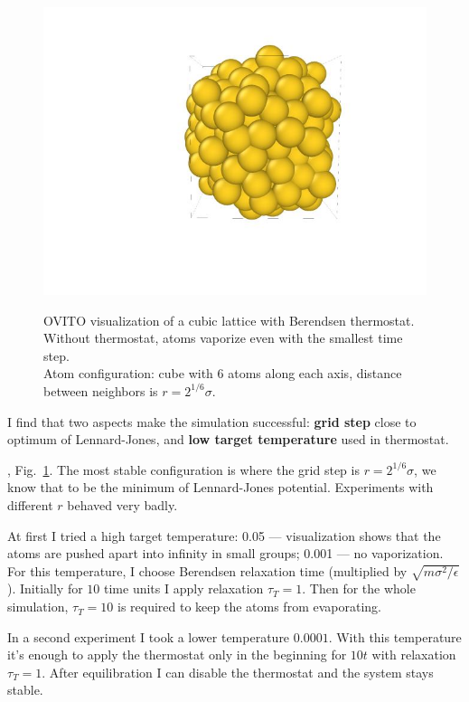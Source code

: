 \documentclass[12pt,a4paper]{article}
\begin{document}
\begin{figure}[htb]
\begin{minipage}{.3\textwidth}
{			\includegraphics[trim={1.8cm 1.8cm 2.2cm 1cm},clip]{img/sim3.jpg}}
	\end{minipage}
	\caption{OVITO visualization of a cubic lattice with Berendsen thermostat. Without thermostat, atoms vaporize even with the smallest time step.\\
	Atom configuration: cube with 6 atoms along each axis, distance between neighbors is $r=2^{1/6}\sigma$.  }
	\label{fig:first_simulation_ovito}
\end{figure}



I find that two aspects make the simulation successful: {\bf grid step} close to optimum of Lennard-Jones, and {\bf low target temperature} used in thermostat.

, Fig.~\ref{fig:first_simulation_ovito}. The most stable configuration is where the grid step is $r = 2^{1/6}\sigma$, we know that to be the minimum of Lennard-Jones potential. Experiments with different $r$ behaved very badly.

At first I tried a high target temperature: 0.05 --- visualization shows that the atoms are pushed apart into infinity in small groups; 0.001 --- no vaporization. For this temperature, I choose Berendsen relaxation time (multiplied by \( \sqrt{m\sigma^2 / \epsilon} \)). Initially for $10$ time units I apply relaxation \( \tau_T = 1 \). Then for the whole simulation, \( \tau_T = 10 \) is required to keep the atoms from evaporating. 

In a second experiment I took a lower temperature $0.0001$. With this temperature it's enough to apply the thermostat only in the beginning for $10t$ with relaxation $\tau_T = 1$. After equilibration I can disable the thermostat and the system stays stable.
\end{document}
